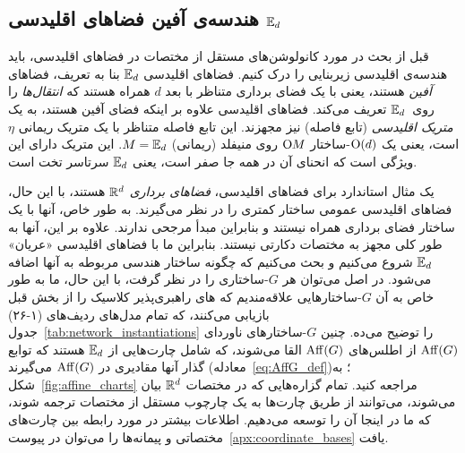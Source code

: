 

\subsection
[هندسه‌ی آفین فضاهای اقلیدسی \texorpdfstring{$\Euc_d$}{}]%
{هندسه‌ی آفین فضاهای اقلیدسی $\Euc_d$}
\label{sec:euclidean_geometry}


قبل از بحث در مورد کانولوشن‌های مستقل از مختصات در فضاهای اقلیدسی، باید هندسه‌ی اقلیدسی زیربنایی را درک کنیم.
فضاهای اقلیدسی $\Euc_d$ بنا به تعریف، فضاهای \emph{آفین} هستند، یعنی با یک فضای برداری متناظر با بعد $d$ همراه هستند که \emph{انتقال‌ها} را روی~$\Euc_d$ تعریف می‌کند.
فضاهای اقلیدسی علاوه بر اینکه فضای آفین هستند، به یک \emph{متریک اقلیدسی} (تابع فاصله) نیز مجهزند.
این تابع فاصله متناظر با یک متریک ریمانی $\eta$ است، یعنی یک $\operatorname{O}(d)$-ساختار $\operatorname{O}\mkern-3.6muM$ روی منیفلد (ریمانی) $M=\mathbb{E}_d$.
این متریک دارای این ویژگی است که انحنای آن در همه جا صفر است، یعنی $\Euc_d$ سرتاسر تخت است.


یک مثال استاندارد برای فضاهای اقلیدسی، \emph{فضاهای برداری} $\mathbb{R}^d$ هستند، با این حال، فضاهای اقلیدسی عمومی ساختار کمتری را در نظر می‌گیرند.
به طور خاص، آنها با یک ساختار فضای برداری همراه نیستند و بنابراین مبدأ مرجحی ندارند.
علاوه بر این، آنها به طور کلی مجهز به مختصات دکارتی نیستند.
بنابراین ما با فضاهای اقلیدسی «عریان» $\Euc_d$ شروع می‌کنیم و بحث می‌کنیم که چگونه ساختار هندسی مربوطه به آنها اضافه می‌شود.
در اصل می‌توان هر $G$-ساختاری را در نظر گرفت، با این حال، ما به طور خاص به آن $G$-ساختارهایی علاقه‌مندیم که های راهبری‌پذیر کلاسیک را از بخش قبل بازیابی می‌کنند، که تمام مدل‌های ردیف‌های (۱-۲۶) جدول~\ref{tab:network_instantiations} را توضیح می‌ده.
چنین $G$-ساختارهای ناوردای $\operatorname{Aff}(G)$ از اطلس‌های $\operatorname{Aff}(G)$ القا می‌شوند، که شامل چارت‌هایی از $\Euc_d$ هستند که توابع گذار آنها مقادیری در $\operatorname{Aff}(G)$ می‌گیرند (معادله~\eqref{eq:AffG_def})؛ به شکل~\ref{fig:affine_charts} مراجعه کنید.
تمام گزاره‌هایی که در مختصات $\mathbb{R}^d$ بیان می‌شوند، می‌توانند از طریق چارت‌ها به یک چارچوب مستقل از مختصات ترجمه شوند، که ما در اینجا آن را توسعه می‌دهیم.
اطلاعات بیشتر در مورد رابطه بین چارت‌های مختصاتی و پیمانه‌ها را می‌توان در پیوست~\ref{apx:coordinate_bases} یافت.

